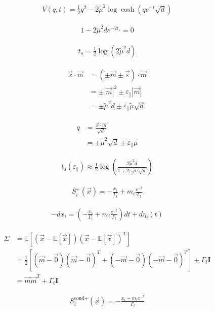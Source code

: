 \documentclass[11pt,a4paper]{article}
\begin{document}
\begin{align}
V(q, t) = \frac{1}{2}q^2 - 2\tilde{\mu}^2 \log \cosh\left(q e^{-t} \sqrt{d}\right)
\end{align}

\begin{align}
1 - 2\tilde{\mu}^2 d e^{-2t_s} = 0
\end{align}

\begin{align}
t_s = \frac{1}{2}\log(2\tilde{\mu}^2 d)
\end{align}

\begin{align}
\vec{x} \cdot \vec{m} &= (\pm\vec{m} \pm \vec{\varepsilon}) \cdot \vec{m}\\
&= \pm|\vec{m}|^2 \pm \varepsilon_{\parallel}|\vec{m}|\\
&= \pm\tilde{\mu}^2 d \pm \varepsilon_{\parallel}\tilde{\mu}\sqrt{d}
\end{align}

\begin{align}
q &= \frac{\vec{x} \cdot \vec{m}}{\sqrt{d}}\\
&= \pm\tilde{\mu}^2\sqrt{d} \pm \varepsilon_{\parallel}\tilde{\mu}
\end{align}

\begin{align}
t_s(\varepsilon_{\parallel}) \approx \frac{1}{2}\log\left(\frac{2\tilde{\mu}^2 d}{1 + 2\varepsilon_{\parallel}\tilde{\mu}/\sqrt{d}}\right)
\end{align}

\begin{align}
S_i^+(\vec{x}) = -\frac{x_i}{\Gamma_t} + m_i\frac{e^{-t}}{\Gamma_t}
\end{align}

\begin{align}
-dx_i = \left(-\frac{x_i}{\Gamma_t} + m_i\frac{e^{-t}}{\Gamma_t}\right)dt + d\eta_i(t)
\end{align}

\begin{align}
\Sigma &= \mathbb{E}[(\vec{x}-\mathbb{E}[\vec{x}])(\vec{x}-\mathbb{E}[\vec{x}])^T] \\
&= \frac{1}{2}\left[ (\vec{m}-\vec{0})(\vec{m}-\vec{0})^T + (-\vec{m}-\vec{0})(-\vec{m}-\vec{0})^T \right] + \Gamma_t \mathbf{I} \\
&= \vec{m}\vec{m}^T + \Gamma_t \mathbf{I}
\end{align}

\begin{align}
S_i^{\text{cond}+}(\vec{x}) = -\frac{x_i - m_i e^{-t}}{\Gamma_t}
\end{align}
\end{document}
